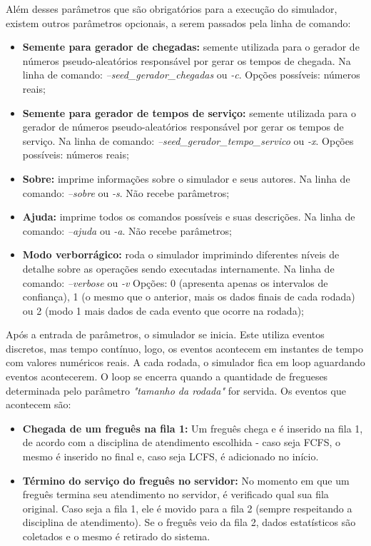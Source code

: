 \documentclass[a4paper,10pt]{article}
\begin{document}
    Além desses parâmetros que são obrigatórios para a execução do simulador, existem outros parâmetros opcionais, a serem passados pela linha de comando:

\begin {itemize}
\item \textbf{Semente para gerador de chegadas:} semente utilizada para o gerador de números pseudo-aleatórios responsável por gerar os tempos de chegada. Na linha de comando: \emph{--seed\_gerador\_chegadas} ou \emph{-c}. Opções possíveis: números reais;

\item \textbf{Semente para gerador de tempos de serviço:} semente utilizada para o gerador de números pseudo-aleatórios responsável por gerar os tempos de serviço. Na linha de comando: \emph{--seed\_gerador\_tempo\_servico} ou \emph{-x}. Opções possíveis: números reais;

\item \textbf{Sobre:} imprime informações sobre o simulador e seus autores. Na linha de comando: \emph{--sobre} ou \emph{-s}. Não recebe parâmetros;

\item \textbf{Ajuda:} imprime todos os comandos possíveis e suas descrições. Na linha de comando: \emph{--ajuda} ou \emph{-a}. Não recebe parâmetros;

\item \textbf{Modo verborrágico:} roda o simulador imprimindo diferentes níveis de detalhe sobre as operações sendo executadas internamente. Na linha de comando: \emph{--verbose} ou \emph{-v} Opções: 0 (apresenta apenas os intervalos de confiança), 1 (o mesmo que o anterior, mais os dados finais de cada rodada) ou 2 (modo 1 mais dados de cada evento que ocorre na rodada);
\end {itemize}

    Após a entrada de parâmetros, o simulador se inicia. Este utiliza eventos discretos, mas tempo contínuo, logo, os eventos acontecem em instantes de tempo com valores numéricos reais. A cada rodada, o simulador fica em loop aguardando eventos acontecerem. O loop se encerra quando a quantidade de fregueses determinada pelo parâmetro \emph{"tamanho da rodada"} for servida. Os eventos que acontecem são:

\begin {itemize}
\item \textbf{Chegada de um freguês na fila 1:} Um freguês chega e é inserido na fila 1, de acordo com a disciplina de atendimento escolhida - caso seja FCFS, o mesmo é inserido no final e, caso seja LCFS, é adicionado no início.

\item \textbf{Término do serviço do freguês no servidor:} No momento em que um freguês termina seu atendimento no servidor, é verificado qual sua fila original. Caso seja a fila 1,
ele é movido para a fila 2 (sempre respeitando a disciplina de atendimento). Se o freguês veio da fila 2, dados estatísticos são coletados e o mesmo é retirado do sistema.
\end {itemize}
\end{document}

